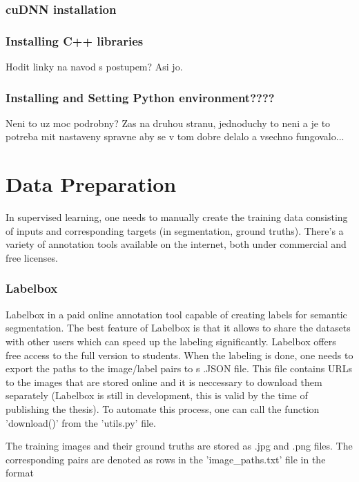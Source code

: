 \subsubsection{cuDNN installation}

\subsubsection{Installing C++ libraries}

Hodit linky na navod s postupem? Asi jo.

\subsubsection{Installing and Setting Python environment????}

Neni to uz moc podrobny? Zas na druhou stranu, jednoduchy to neni a je to potreba mit nastaveny spravne aby se v tom dobre delalo a vsechno fungovalo...



\section{Data Preparation}

In supervised learning, one needs to manually create the training data consisting of inputs and corresponding targets (in segmentation, ground truths). There's a variety of annotation tools available on the internet, both under commercial and free licenses. 

\subsubsection{Labelbox}

Labelbox in a paid online annotation tool capable of creating labels for semantic segmentation. The best feature of Labelbox is that it allows to share the datasets with other users which can speed up the labeling significantly. Labelbox offers free access to the full version to students. When the labeling is done, one needs to export the paths to the image/label pairs to s .JSON file. This file contains URLs to the images that are stored online and it is neccessary to download them separately (Labelbox is still in development, this is valid by the time of publishing the thesis). To automate this process, one can call the function 'download()' from the 'utils.py' file. 

The training images and their ground truths are stored as .jpg and .png files. The corresponding pairs are denoted as rows in the 'image\_paths.txt' file in the format 

